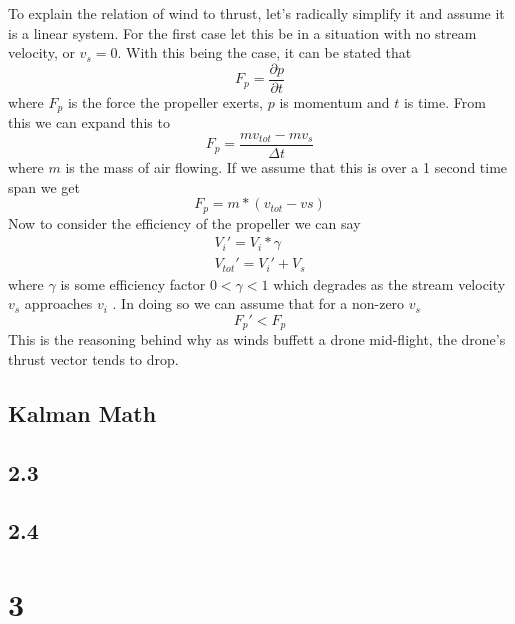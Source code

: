 \documentclass[twocolumn]{article}
\begin{document}
	
	To explain the relation of wind to thrust, let's radically simplify it and assume it is a linear system. For the first case let this be in a situation with no stream velocity, or $v_s = 0$. With this being the case, it can be stated that 
	\begin{equation}
	F_p= \frac{\partial p}{\partial t}
	\label{fvm}
	\end{equation}
	where $F_p$ is the force the propeller exerts, $p$ is momentum and $t$ is time. From this we can expand this to 
	\begin{equation}
	F_p= \frac{mv_{tot} - mv_{s}}{\Delta t} 
	\label{fvm2}
	\end{equation}
	where $m$ is the mass of air flowing. If we assume that this is over a 1 second time span we get
	\begin{equation}
	F_p= m*(v_{tot}-v{s}) 
	\label{fvm3}
	\end{equation}
	Now to consider the efficiency of the propeller we can say 
	\begin{eqnarray}	
	V_{i}\prime = V_{i}* \gamma\\
	V_{tot}\prime = V_i\prime + V_s
	\label{eff}
	\end{eqnarray}
	where $\gamma$ is some efficiency factor $0 < \gamma < 1$ which degrades as the stream velocity $v_s$ approaches $v_i$ \cite{someone}. In doing so we can assume that for a non-zero $v_s$ 
	\begin{equation}
	F_p\prime < F_p
	\end{equation}
	This is the reasoning behind why as winds buffett a drone mid-flight, the drone's thrust vector tends to drop. 
	\subsection{Kalman Math}
	\subsection{2.3}
	\subsection{2.4}
	
	\section{3}
\end{document}
